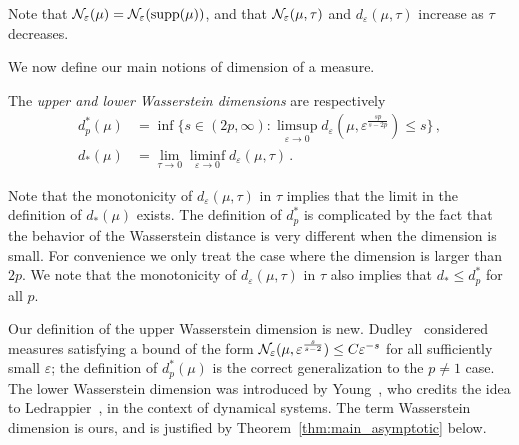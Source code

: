 \documentclass[sts]{imsart}
\newcommand*{\ep}{\varepsilon}
\DeclareMathOperator{\supp}{supp}
\begin{document}
Note that $\cN_\ep(\mu) = \cN_\ep(\supp(\mu))$, and that $\cN_\ep(\mu, \tau)$ and $d_\ep(\mu, \tau)$ increase as $\tau$ decreases.


We now define our main notions of dimension of a measure.
\begin{definition}
The \emph{upper and lower Wasserstein dimensions} are respectively
\begin{align*}
d_p^*(\mu) & = \inf \{s \in (2p, \infty): \limsup_{\ep \to 0} d_\ep(\mu, \ep^{\frac{sp}{s-2p}}) \leq s\}\,, \\
d_*(\mu) & = \lim_{\tau \to 0} \liminf_{\ep \to 0} d_\ep(\mu, \tau)\,.
\end{align*}
\end{definition}
Note that the monotonicity of $d_\ep(\mu, \tau)$ in $\tau$ implies that the limit in the definition of $d_*(\mu)$ exists.
The definition of $d_p^*$ is complicated by the fact that the behavior of the Wasserstein distance is very different when the dimension is small.
For convenience we only treat the case where the dimension is larger than $2p$.
We note that the monotonicity of $d_\ep(\mu, \tau)$ in $\tau$ also implies that $d_* \leq d_p^*$ for all $p$.

Our definition of the upper Wasserstein dimension is new.
Dudley~\cite{Dud68} considered measures satisfying a bound of the form $\cN_\ep(\mu, \ep^{\frac{s}{s-2}}) \leq C \ep^{-s}$ for all sufficiently small $\ep$; the definition of $d_p^*(\mu)$ is the correct generalization to the $p \neq 1$ case.
The lower Wasserstein dimension was introduced by Young~\cite{You82}, who credits the idea to Ledrappier~\cite{Led81}, in the context of dynamical systems.
The term Wasserstein dimension is ours, and is justified by Theorem~\ref{thm:main_asymptotic} below.
\end{document}
